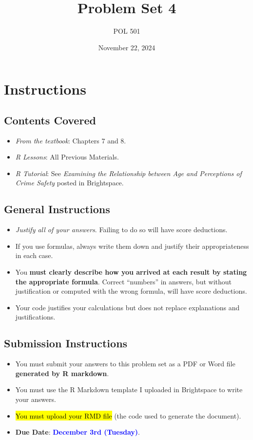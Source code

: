 \documentclass[a4paper, 11pt]{article}
\title{Problem Set 4}
\author{POL 501}
\date{November 22, 2024}
\begin{document}
\maketitle

\section*{Instructions}
\subsection*{Contents Covered}
\begin{itemize}
    \item \emph{From the textbook}: Chapters 7 and 8.
    \item \emph{R Lessons}: All Previous Materials.
    \item \emph{R Tutorial}: See \emph{Examining the Relationship between Age and Perceptions of Crime Safety} posted in Brightspace.
\end{itemize}
\subsection*{General Instructions}
\begin{itemize}
    \item \emph{Justify all of your answers}. Failing to do so will have score deductions.
    \item If you use formulas, always write them down and justify their appropriateness in each case.
    \item You \textbf{must clearly describe how you arrived at each result by stating the appropriate formula}. Correct ``numbers'' in answers, but without justification or computed with the wrong formula, will have score deductions.
    \item Your code justifies your calculations but does not replace explanations and justifications.
\end{itemize}
\subsection*{Submission Instructions}
\begin{itemize}
    \item You must submit your answers to this problem set as a PDF or Word file \textbf{generated by R markdown}.
    \item You must use the R Markdown template I uploaded in Brightspace to write your answers.
    \item \hl{You must upload your RMD file} (the code used to generate the document).
    \item \textbf{Due Date}: \textcolor{blue}{\textbf{December 3rd (Tuesday)}}.
\end{itemize}
\end{document}
